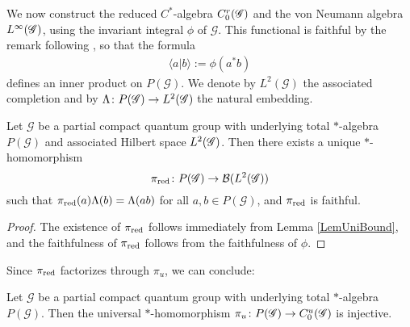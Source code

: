 We now construct the reduced $C^{*}$-algebra $C^{r}_{0}(\mathscr{G})$ and the von Neumann algebra $L^{\infty}(\mathscr{G})$, using the invariant integral $\phi$ of  $\mathscr{G}$. This functional is faithful  by the remark following \cite[Corollary 2.16]{DCT1}, so that the formula
\begin{align*}
  \langle a|b\rangle :=\phi(a^{*}b)
\end{align*}
 defines an inner product on $P(\mathscr{G})$.
We denote by $L^{2}(\mathscr{G})$ the associated completion and by
$\Lambda \colon P(\mathscr{G}) \to L^{2}(\mathscr{G})$ the natural embedding.

\begin{Prop} \label{prop:gns} Let $\mathscr{G}$ be a partial compact
  quantum group with underlying total $*$-algebra $P(\mathscr{G})$ and
  associated Hilbert space $L^{2}(\mathscr{G})$. Then there exists a unique
  $*$-homomorphism \[\pi_{\operatorname{\mathrm{red}}}\colon P(\mathscr{G}) \to {\cal B}(L^{2}(\mathscr{G}))\]
  such that $\pi_{\operatorname{\mathrm{red}}}(a)\Lambda(b)=\Lambda(ab)$ for all $a,b\in
  P(\mathscr{G})$, and $\pi_{\operatorname{\mathrm{red}}}$ is faithful.
\end{Prop}
\begin{proof} The existence of $\pi_{\operatorname{\mathrm{red}}}$ follows immediately from Lemma \ref{LemUniBound}, and the faithfulness of $\pi_{\operatorname{\mathrm{red}}}$ follows from the faithfulness of $\phi$. 
\end{proof}
Since $\pi_{\operatorname{\mathrm{red}}}$ factorizes through $\pi_{u}$, we can conclude:
\begin{Cor}
  Let $\mathscr{G}$ be a partial compact quantum group with underlying
  total $*$-algebra $P(\mathscr{G})$. Then the
universal $*$-homomorphism $\pi_{u} \colon P(\mathscr{G}) \to C^{u}_{0}(\mathscr{G})$ is injective.
\end{Cor}

